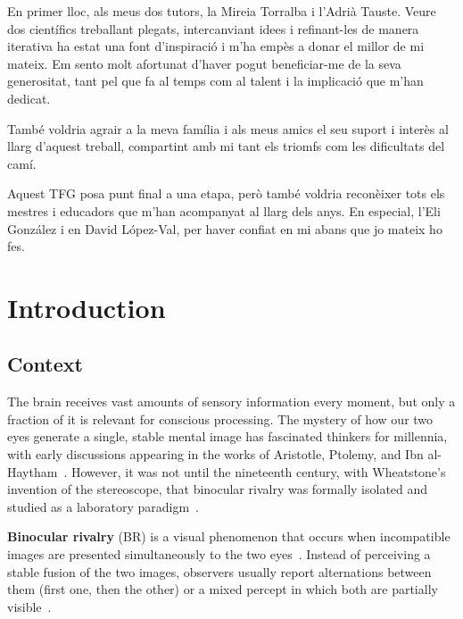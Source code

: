 \documentclass[11pt,a4paper,chapterprefix=false,parskip=false]{scrreprt}
\renewcommand*{\chapterpagestyle}{plain}
\begin{document}
En primer lloc, als meus dos tutors, la Mireia Torralba i l'Adrià Tauste. Veure dos científics treballant plegats, intercanviant idees i refinant-les de manera iterativa ha estat una font d'inspiració i m'ha empès a donar el millor de mi mateix. Em sento molt afortunat d'haver pogut beneficiar-me de la seva generositat, tant pel que fa al temps com al talent i la implicació que m'han dedicat.

També voldria agrair a la meva família i als meus amics el seu suport i interès al llarg d'aquest treball, compartint amb mi tant els triomfs com les dificultats del camí.

Aquest TFG posa punt final a una etapa, però també voldria reconèixer tots els mestres i educadors que m'han acompanyat al llarg dels anys. En especial, l'Eli González i en David López-Val, per haver confiat en mi abans que jo mateix ho fes.

\tableofcontents

\cleardoublepage
{}
\pagestyle{scrheadings}
\renewcommand*{\chapterpagestyle}{scrheadings}

\chapter{Introduction}
\label{chap:introduction}

\section{Context}
The brain receives vast amounts of sensory information every moment, but only a fraction of it is relevant for conscious processing. The mystery of how our two eyes generate a single, stable mental image has fascinated thinkers for millennia, with early discussions appearing in the works of Aristotle, Ptolemy, and Ibn al-Haytham~\citep{biasiucci_electroencephalography_2019}. However, it was not until the nineteenth century, with Wheatstone's invention of the stereoscope, that binocular rivalry was formally isolated and studied as a laboratory paradigm~\cite{biasiucci_electroencephalography_2019}.


\textbf{Binocular rivalry} (BR) is a visual phenomenon that occurs when incompatible images are presented simultaneously to the two eyes~\cite{blake_can_2014}. Instead of perceiving a stable fusion of the two images,  observers usually report alternations between them (first one, then the other) or a mixed percept in which both are partially visible~\citep{blake_can_2014, wade_early_2013}.
\end{document}
